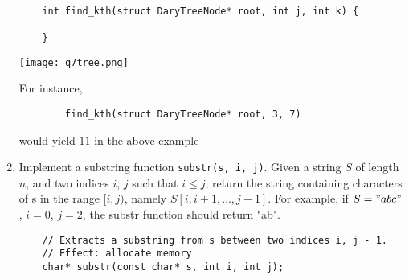 \documentclass{article}
\begin{document}
\begin{enumerate}
\begin{lstlisting}
    
    int find_kth(struct DaryTreeNode* root, int j, int k) {
        
    }
\end{lstlisting}

    \texttt{[image: q7tree.png]}
    
    For instance, 
    \begin{lstlisting}
        find_kth(struct DaryTreeNode* root, 3, 7)
    \end{lstlisting} would yield $11$ in the above example



        

    \newpage
    \item Implement a substring function \texttt{substr(s, i, j)}. Given a string \( S \) of length \( n \), and two indices \( i \), \( j \) such that \( i \leq j \), return the string containing characters of s in the range \( [i, j) \), namely \( S[i, i + 1, \ldots, j - 1] \). For example, if \( S = "abc" \), \( i = 0 \), \( j = 2 \), the substr function should return "ab".
    \begin{lstlisting}
    // Extracts a substring from s between two indices i, j - 1.
    // Effect: allocate memory
    char* substr(const char* s, int i, int j);
    \end{lstlisting}



\end{enumerate}
\end{document}
